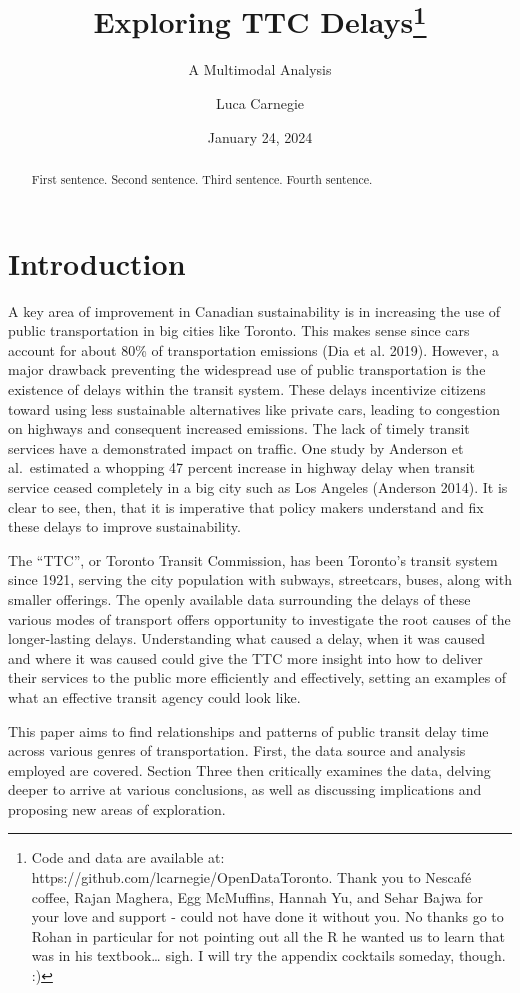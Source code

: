 \documentclass[
  letterpaper,
  DIV=11,
  numbers=noendperiod]{scrartcl}
\title{Exploring TTC Delays\thanks{Code and data are available at:
https://github.com/lcarnegie/OpenDataToronto. Thank you to Nescafé
coffee, Rajan Maghera, Egg McMuffins, Hannah Yu, and Sehar Bajwa for
your love and support - could not have done it without you. No thanks go
to Rohan in particular for not pointing out all the R he wanted us to
learn that was in his textbook\ldots{} sigh. I will try the appendix
cocktails someday, though. :)}}
\subtitle{A Multimodal Analysis}
\author{Luca Carnegie}
\date{January 24, 2024}
\begin{document}
\maketitle
\begin{abstract}
First sentence. Second sentence. Third sentence. Fourth sentence.
\end{abstract}

\section{Introduction}\label{introduction}

A key area of improvement in Canadian sustainability is in increasing
the use of public transportation in big cities like Toronto. This makes
sense since cars account for about 80\% of transportation emissions (Dia
et al. 2019). However, a major drawback preventing the widespread use of
public transportation is the existence of delays within the transit
system. These delays incentivize citizens toward using less sustainable
alternatives like private cars, leading to congestion on highways and
consequent increased emissions. The lack of timely transit services have
a demonstrated impact on traffic. One study by Anderson et al.~estimated
a whopping 47 percent increase in highway delay when transit service
ceased completely in a big city such as Los Angeles (Anderson 2014). It
is clear to see, then, that it is imperative that policy makers
understand and fix these delays to improve sustainability.

The ``TTC'', or Toronto Transit Commission, has been Toronto's transit
system since 1921, serving the city population with subways, streetcars,
buses, along with smaller offerings. The openly available data
surrounding the delays of these various modes of transport offers
opportunity to investigate the root causes of the longer-lasting delays.
Understanding what caused a delay, when it was caused and where it was
caused could give the TTC more insight into how to deliver their
services to the public more efficiently and effectively, setting an
examples of what an effective transit agency could look like.

This paper aims to find relationships and patterns of public transit
delay time across various genres of transportation. First, the data
source and analysis employed are covered. Section Three then critically
examines the data, delving deeper to arrive at various conclusions, as
well as discussing implications and proposing new areas of exploration.
\end{document}
